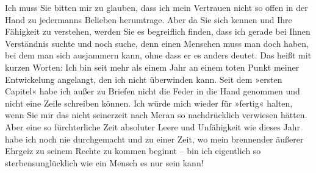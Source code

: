 \pstart
           Ich muss Sie bitten mir zu glauben, dass ich mein Vertrauen  nicht so offen in der Hand zu jedermanns Belieben herumtrage.
               Aber da Sie sich kennen und Ihre Fähigkeit zu verstehen, werden Sie es begreiflich
               finden, dass ich gerade bei Ihnen Verständnis suchte und noch suche, denn einen
               Menschen muss man doch haben, bei dem man sich ausjammern kann, ohne dass er es
               anders deutet. Das heißt mit kurzen Worten: Ich bin seit mehr als einem Jahr an einem
               toten {\pb}Punkt meiner Entwickelung angelangt, den ich
               nicht überwinden kann. Seit dem »ersten
               Capitel« habe ich außer zu Briefen nicht die Feder in die Hand genommen und
               nicht eine Zeile schreiben können. Ich würde mich wieder für »fertig« halten, wenn
               Sie mir das nicht seinerzeit nach Meran so
               nachdrücklich verwiesen hätten. Aber eine so fürchterliche Zeit absoluter Leere und
               Unfähigkeit wie dieses Jahr habe ich noch nie durchgemacht und zu einer
               Zeit, wo mein brennender äußerer Ehrgeiz 
               zu seinem Rechte zu kommen beginnt – bin ich eigentlich so sterbensunglücklich wie
               ein Mensch es nur sein kann!\pend
           
